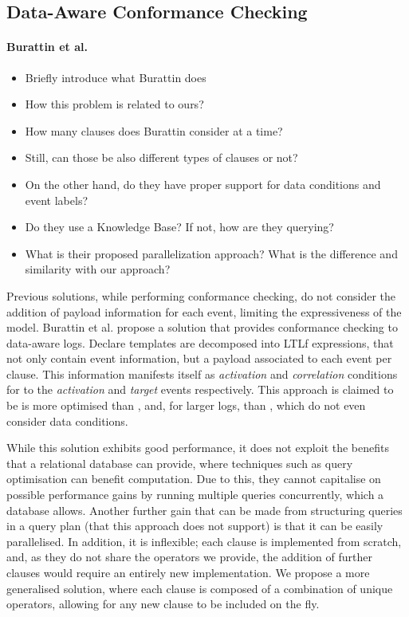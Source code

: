\subsection{Data-Aware Conformance Checking}

\paragraph*{Burattin et al.}
\begin{itemize}
	\item{Briefly introduce what Burattin does}
	\item{How this problem is related to ours?}
	\item{How many clauses does Burattin consider at a time?}
	\item{Still, can those be also different types of clauses or not?}
	\item{On the other hand, do they have proper support for data conditions and event labels?}
	\item{Do they use a Knowledge Base? If not, how are they querying?}
	\item{What is their proposed parallelization approach? What is the difference and similarity with our approach?}
\end{itemize}
Previous solutions, while performing conformance checking, do not consider the addition of payload information for each event, limiting the expressiveness of the model. Burattin et al. \cite{BurattinMS16} propose a solution that provides conformance checking to data-aware logs. Declare templates are decomposed into LTLf expressions, that not only contain event information, but a payload associated to each event per clause. This information manifests itself as \emph{activation} and \emph{correlation} conditions for to the \emph{activation} and \emph{target} events respectively. This approach is claimed to be is more optimised than \cite{VanDerAalst2005}, and, for larger logs, than \cite{Burattin2012}, which do not even consider data conditions. 

While this solution exhibits good performance, it does not exploit the benefits that a relational database can provide, where techniques such as query optimisation can benefit computation. Due to this, they cannot capitalise on possible performance gains by running multiple queries concurrently, which a database allows. Another further gain that can be made from structuring queries in a query plan (that this approach does not support) is that it can be easily parallelised. In addition, it is inflexible; each clause is implemented from scratch, and, as they do not share the operators we provide, the addition of further clauses would require an entirely new implementation. We propose a more generalised solution, where each clause is composed of a combination of unique operators, allowing for any new clause to be included on the fly. 

